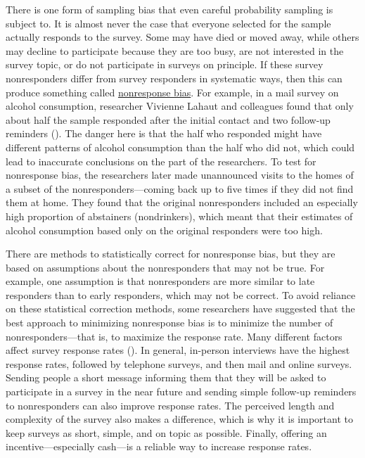 \documentclass[
]{krantz}
\begin{document}
There is one form of sampling bias that even careful probability sampling is subject to. It is almost never the case that everyone selected for the sample actually responds to the survey. Some may have died or moved away, while others may decline to participate because they are too busy, are not interested in the survey topic, or do not participate in surveys on principle. If these survey nonresponders differ from survey responders in systematic ways, then this can produce something called \hyperref[nonresponse-bias]{nonresponse bias}. For example, in a mail survey on alcohol consumption, researcher Vivienne Lahaut and colleagues found that only about half the sample responded after the initial contact and two follow-up reminders (). The danger here is that the half who responded might have different patterns of alcohol consumption than the half who did not, which could lead to inaccurate conclusions on the part of the researchers. To test for nonresponse bias, the researchers later made unannounced visits to the homes of a subset of the nonresponders---coming back up to five times if they did not find them at home. They found that the original nonresponders included an especially high proportion of abstainers (nondrinkers), which meant that their estimates of alcohol consumption based only on the original responders were too high.

There are methods to statistically correct for nonresponse bias, but they are based on assumptions about the nonresponders that may not be true. For example, one assumption is that nonresponders are more similar to late responders than to early responders, which may not be correct. To avoid reliance on these statistical correction methods, some researchers have suggested that the best approach to minimizing nonresponse bias is to minimize the number of nonresponders---that is, to maximize the response rate. Many different factors affect survey response rates (). In general, in-person interviews have the highest response rates, followed by telephone surveys, and then mail and online surveys. Sending people a short message informing them that they will be asked to participate in a survey in the near future and sending simple follow-up reminders to nonresponders can also improve response rates. The perceived length and complexity of the survey also makes a difference, which is why it is important to keep surveys as short, simple, and on topic as possible. Finally, offering an incentive---especially cash---is a reliable way to increase response rates.
\end{document}

